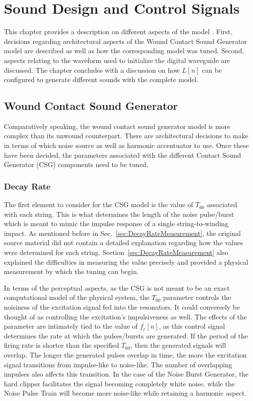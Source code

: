 \documentclass[../main.tex]{subfiles}
\begin{document}
\chapter{Sound Design and Control Signals}
\label{ch:Ch6}
This chapter provides a description on different aspects of the model . First, decisions regarding architectural aspects of the Wound Contact Sound Generator model are described as well as how the corresponding model was tuned. Second, aspects relating to the waveform used to initialize the digital waveguide are discussed. The chapter concludes with a discussion on how $L[n]$ can be configured to generate different sounds with the complete model.

\section{Wound Contact Sound Generator}
Comparatively speaking, the wound contact sound generator model is more complex than its unwound counterpart. There are architectural decisions to make in terms of which noise source as well as harmonic accentuator to use. Once these have been decided, the parameters associated with the different Contact Sound Generator (CSG) components need to be tuned.

\subsection{Decay Rate}
\label{subsec:Ch6DecayRate}
The first element to consider for the CSG model is the value of $T_{60}$ associated with each string. This is what determines the length of the noise pulse/burst which is meant to mimic the impulse response of a single string-to-winding impact. As mentioned before in Sec.~\ref{sec:DecayRateMeasurement}, the original source material did not contain a detailed explanation regarding how the values were determined for each string. Section~\ref{sec:DecayRateMeasurement} also explained the difficulties in measuring the value precisely and provided a physical measurement by which the tuning can begin.

In terms of the perceptual aspects, as the CSG is not meant to be an exact computational model of the physical system, the $T_{60}$ parameter controls the noisiness of the excitation signal fed into the resonators. It could conversely be thought of as controlling the excitation's impulsiveness as well. The effects of the parameter are intimately tied to the value of $f_c[n]$, as this control signal determines the rate at which the pulses/bursts are generated. If the period of the firing rate is shorter than the specified $T_{60}$, then the generated signals will overlap. The longer the generated pulses overlap in time, the more the excitation signal transitions from impulse-like to noise-like. The number of overlapping impulses also affects this transition. In the case of the Noise Burst Generator, the hard clipper facilitates the signal becoming completely white noise, while the Noise Pulse Train will become more noise-like while retaining a harmonic aspect. 
\end{document}
